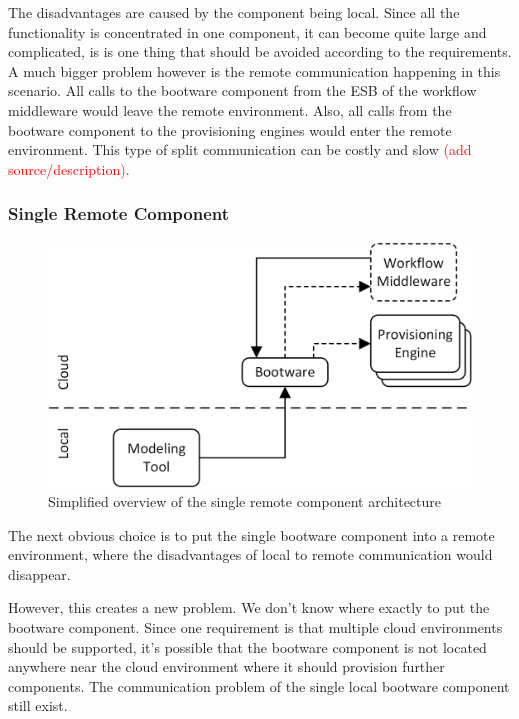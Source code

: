 The disadvantages are caused by the component being local.
Since all the functionality is concentrated in one component, it can become quite large and complicated, is is one thing that should be avoided according to the requirements.
A much bigger problem however is the remote communication happening in this scenario.
All calls to the bootware component from the ESB of the workflow middleware would leave the remote environment.
Also, all calls from the bootware component to the provisioning engines would enter the remote environment.
This type of split communication can be costly and slow \textcolor{red}{(add source/description)}.

\subsubsection{Single Remote Component}

\begin{figure}[!htbp]
	\centering
	\includegraphics[resolution=600]{design/assets/simple_remote}
	\caption{Simplified overview of the single remote component architecture}
	\label{image:single_remote}
\end{figure}

The next obvious choice is to put the single bootware component into a remote environment, where the disadvantages of local to remote communication would disappear.

However, this creates a new problem.
We don't know where exactly to put the bootware component.
Since one requirement is that multiple cloud environments should be supported, it's possible that the bootware component is not located anywhere near the cloud environment where it should provision further components.
The communication problem of the single local bootware component still exist.

